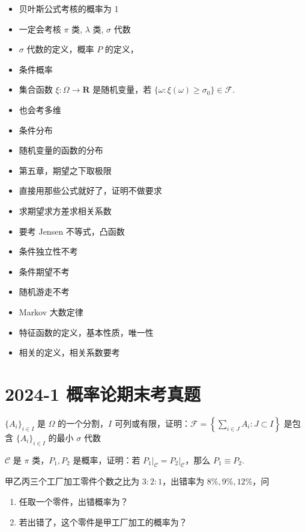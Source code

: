 \begin{itemize}
    \item 贝叶斯公式考核的概率为 1
    \item 一定会考核 $\pi$ 类, $\lambda$ 类, $\sigma$ 代数
    \item $\sigma$ 代数的定义，概率 $P$ 的定义，
    \item 条件概率
    \item 集合函数 $\xi:\Omega \to \mathbf{R}$ 是随机变量，若 $\{ \omega:\xi (\omega)\geq\sigma_{0} \}\in \mathcal{F}$.
    \item 也会考多维
    \item 条件分布
    \item 随机变量的函数的分布
    \item 第五章，期望之下取极限
    \item 直接用那些公式就好了，证明不做要求
    \item 求期望求方差求相关系数
    \item 要考 Jensen 不等式，凸函数
    \item 条件独立性不考
    \item 条件期望不考
    \item 随机游走不考
    \item Markov 大数定律
    \item 特征函数的定义，基本性质，唯一性
    \item 相关的定义，相关系数要考
\end{itemize}

\section{2024-1 概率论期末考真题}

\begin{problem}
$\{ A_{i} \}_{i\in I}$ 是 $\Omega$ 的一个分割，$I$ 可列或有限，证明：$\mathscr{F}=\left\{  \sum_{i\in J}A_{i}:J\subset I  \right\}$ 是包含 $\{ A_{i} \}_{i\in I}$ 的最小 $\sigma$ 代数
\end{problem}

\begin{problem}
$\mathscr{C}$ 是 $\pi$ 类，$P_{1},P_{2}$ 是概率，证明：若 $\left.P_{1}\right|_{\mathscr{C}}=\left.P_{2}\right|_{\mathscr{C}}$，那么 $P_{1}\equiv P_{2}$.
\end{problem}

\begin{problem}
甲乙丙三个工厂加工零件个数之比为 $3:2:1$，出错率为 $8\%, 9\%, 12\%$，问
\begin{enumerate}
    \item 任取一个零件，出错概率为？
    \item 若出错了，这个零件是甲工厂加工的概率为？
\end{enumerate}
\end{problem}

